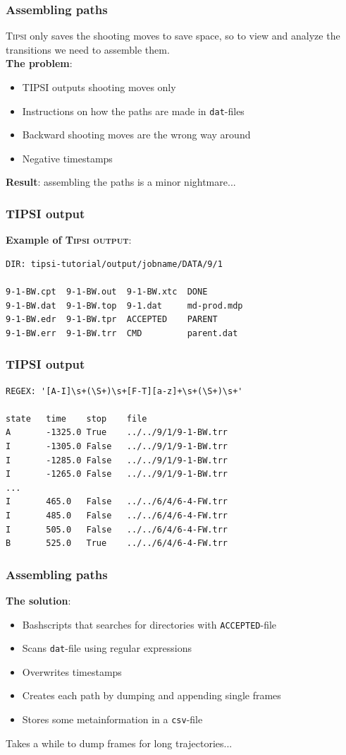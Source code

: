 \documentclass[hyperref={pdfpagelabels=false}]{beamer}
\begin{document}
\begin{frame}
\frametitle{Assembling paths}
\textsc{Tipsi} only saves the shooting moves to save space, so to view and analyze the transitions we need to assemble them.\\
\textbf{The problem}: 
\begin{itemize}
\item \textsc{TIPSI} outputs shooting moves only
\item Instructions on how the paths are made in \texttt{dat}-files
\item Backward shooting moves are the wrong way around
\item Negative timestamps
\end{itemize}
\textbf{Result}: assembling the paths is a minor nightmare...
\end{frame}

\begin{frame}[fragile]
\frametitle{\textsc{TIPSI} output}
\textbf{Example of \textsc{Tipsi output}}:
\begin{lstlisting}
DIR: tipsi-tutorial/output/jobname/DATA/9/1

9-1-BW.cpt  9-1-BW.out  9-1-BW.xtc  DONE
9-1-BW.dat  9-1-BW.top  9-1.dat     md-prod.mdp
9-1-BW.edr  9-1-BW.tpr  ACCEPTED    PARENT
9-1-BW.err  9-1-BW.trr  CMD         parent.dat
\end{lstlisting}
\end{frame}

\begin{frame}[fragile]
\frametitle{\textsc{TIPSI} output}
\begin{lstlisting}
REGEX: '[A-I]\s+(\S+)\s+[F-T][a-z]+\s+(\S+)\s+'

state   time    stop    file
A       -1325.0 True    ../../9/1/9-1-BW.trr
I       -1305.0 False   ../../9/1/9-1-BW.trr
I       -1285.0 False   ../../9/1/9-1-BW.trr
I       -1265.0 False   ../../9/1/9-1-BW.trr
...
I       465.0   False   ../../6/4/6-4-FW.trr
I       485.0   False   ../../6/4/6-4-FW.trr
I       505.0   False   ../../6/4/6-4-FW.trr
B       525.0   True    ../../6/4/6-4-FW.trr
\end{lstlisting}
\end{frame}

\begin{frame}
\frametitle{Assembling paths}
\textbf{The solution}: 
\begin{itemize}
\item Bashscripts that searches for directories with \texttt{ACCEPTED}-file
\item Scans \texttt{dat}-file using regular expressions
\item Overwrites timestamps
\item Creates each path by dumping and appending single frames
\item Stores some metainformation in a \texttt{csv}-file
\end{itemize}
Takes a while to dump frames for long trajectories...
\end{frame}
\end{document}
